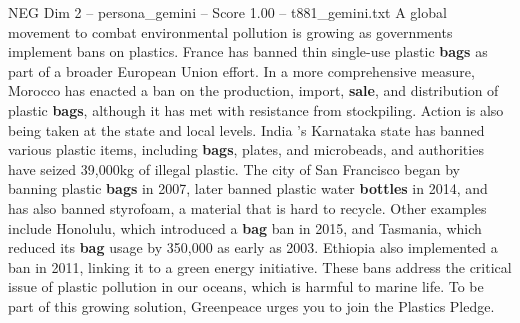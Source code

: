 \begin{textsample}{NEG Dim 2 – persona\_gemini – Score 1.00 – t881\_gemini.txt}  \label{ex:f2_neg_009}
A global movement to combat environmental pollution is growing as governments implement bans on plastics.
France has banned thin single-use plastic \textbf{bags} as part of a broader European Union effort.
In a more comprehensive measure, Morocco has enacted a ban on the production, import, \textbf{sale}, and distribution of plastic \textbf{bags}, although it has met with resistance from stockpiling.
Action is also being taken at the state and local levels.
India 's Karnataka state has banned various plastic items, including \textbf{bags}, plates, and microbeads, and authorities have seized 39,000kg of illegal plastic.
The city of San Francisco began by banning plastic \textbf{bags} in 2007, later banned plastic water \textbf{bottles} in 2014, and has also banned styrofoam, a material that is hard to recycle.
Other examples include Honolulu, which introduced a \textbf{bag} ban in 2015, and Tasmania, which reduced its \textbf{bag} usage by 350,000 as early as 2003.
Ethiopia also implemented a ban in 2011, linking it to a green energy initiative.
These bans address the critical issue of plastic pollution in our oceans, which is harmful to marine life.
To be part of this growing solution, Greenpeace urges you to join the Plastics Pledge.

\end{textsample}
